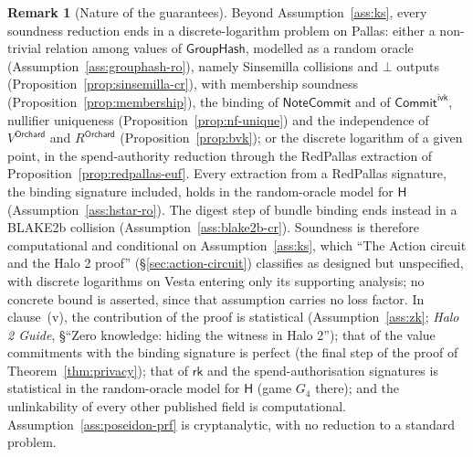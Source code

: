 \documentclass[11pt,a4paper]{article}
\theoremstyle{definition}
\newtheorem{remark}[theorem]{Remark}
\newcommand{\rk}{\mathsf{rk}}
\newcommand{\NoteCommit}{\ensuremath{\mathsf{NoteCommit}}}
\newcommand{\CommitIvk}{\ensuremath{\mathsf{Commit}^{\mathsf{ivk}}}}
\newcommand{\GroupHash}{\ensuremath{\mathsf{GroupHash}}}
\begin{document}
\begin{remark}[Nature of the guarantees]
Beyond Assumption~\ref{ass:ks}, every soundness reduction ends in a
discrete-logarithm problem on Pallas: either a non-trivial relation among
values of $\GroupHash$, modelled as a random oracle
(Assumption~\ref{ass:grouphash-ro}), namely Sinsemilla collisions and
$\bot$ outputs (Proposition~\ref{prop:sinsemilla-cr}), with membership
soundness (Proposition~\ref{prop:membership}), the binding of $\NoteCommit$
and of $\CommitIvk$, nullifier uniqueness
(Proposition~\ref{prop:nf-unique}) and the independence of
$V^{\mathsf{Orchard}}$ and $R^{\mathsf{Orchard}}$
(Proposition~\ref{prop:bvk}); or the discrete logarithm of a given point,
in the spend-authority reduction through the RedPallas extraction of
Proposition~\ref{prop:redpallas-euf}. Every extraction from a RedPallas
signature, the binding signature included, holds in the random-oracle model
for $\mathsf{H}$ (Assumption~\ref{ass:hstar-ro}). The digest step of bundle
binding ends instead in a BLAKE2b collision
(Assumption~\ref{ass:blake2b-cr}). Soundness is therefore computational and
conditional on Assumption~\ref{ass:ks}, which ``The Action circuit and the
Halo 2 proof'' (\S\ref{sec:action-circuit}) classifies as designed but
unspecified, with discrete logarithms on Vesta entering only its supporting
analysis; no concrete bound is asserted, since that assumption carries no
loss factor. In clause~(v), the contribution of the proof is statistical
(Assumption~\ref{ass:zk}; \emph{Halo 2 Guide}, \S``Zero knowledge: hiding
the witness in Halo 2''); that of the value commitments with the binding
signature is perfect (the final step of the proof of
Theorem~\ref{thm:privacy}); that of $\rk$ and the spend-authorisation
signatures is statistical in the random-oracle model for $\mathsf{H}$
(game $G_4$ there); and the unlinkability of every other published field is
computational. Assumption~\ref{ass:poseidon-prf} is cryptanalytic, with no
reduction to a standard problem.
\end{remark}
\end{document}
